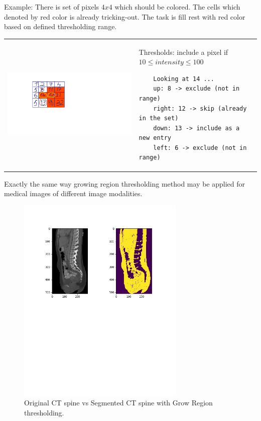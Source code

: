 Example: There is set of pixels $4x4$ which should be colored. The cells which denoted by red color is already tricking-out. The task is fill rest with red color based on defined thresholding range.       

\begin{tabular}{C{7cm}  L{7cm}}
    \includegraphics[width=12cm]{images/grow_region_3.png} & Thresholds: include a pixel if $10 \leq intensity \leq 100$ \newline 
    \begin{lstlisting}
    Looking at 14 ...
    up: 8 -> exclude (not in range)
    right: 12 -> skip (already in the set)
    down: 13 -> include as a new entry
    left: 6 -> exclude (not in range)
    \end{lstlisting}
\end{tabular}

Exactly the same way growing region thresholding method may be applied for medical images of different image modalities.
\begin{figure}[h]
    \centering \includegraphics[width=8cm]{images/ct-spine-grow-region-segmented.jpg}
    \vspace*{-30mm} \caption {Original CT spine vs Segmented CT spine with Grow Region thresholding.}
\end{figure}    

